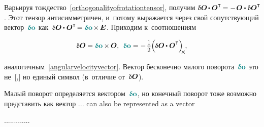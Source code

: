 \begin{otherlanguage}{russian}
Варьируя тождество~\eqref{orthogonalityofrotationtensor}, получим ${\variation{\rotationtensor} \hspace{-0.2ex} \dotp \rotationtensor^{\T} \hspace{-0.2ex} = - \hspace{.2ex} \rotationtensor \dotp \variation{\rotationtensor}^{\T}\!}$.
Этот тензор антисимметричен, и~потому выражается через свой сопутствующий вектор~${\varvector{o}}$ как~${\variation{\rotationtensor} \hspace{-0.1ex} \dotp \rotationtensor^{\T} \hspace{-0.3ex} = \varvector{o} \hspace{-0.2ex} \times \hspace{-0.2ex} \UnitDyad}$.
Приходим к~соотношениям

\nopagebreak\vspace{-0.5em}\begin{equation}
\variation{\rotationtensor} \hspace{-0.1ex} = \varvector{o} \hspace{-0.1ex} \times \hspace{-0.1ex} \rotationtensor , \:\:
\varvector{o} = - \hspace{.2ex} \scalebox{.93}{$ \displaystyle\onehalf $} \hspace{-0.1ex} \Bigl( \hspace{-0.1ex} \variation{\rotationtensor} \hspace{-0.1ex} \dotp \rotationtensor^{\T} \Bigr)_{\hspace{-0.25em}\Xcompanion}
\hspace{-0.1ex} ,
\end{equation}

\vspace{-0.5em}\noindent
аналогичным~\eqref{angularvelocityvector}.
Вектор бесконечно малого поворота~${\varvector{o}}$ это не~[,] но единый символ (в~отличие от~${\updelta\hspace{-0.1ex}\bm{O}}$).

Малый поворот
определяется
вектором~${\varvector{o}}$,
но конечный поворот
тоже возможно представить как вектор
...
can also be represented as a vector

.............




\end{otherlanguage}

